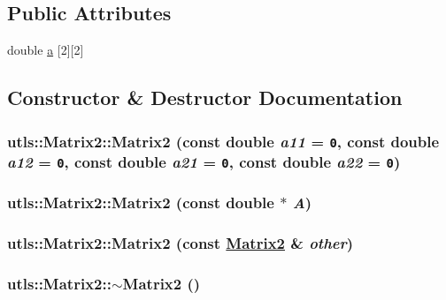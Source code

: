 \subsection*{Public Attributes}
\begin{CompactItemize}
\item 
double \hyperlink{classutls_1_1Matrix2_175b19b6eeaaa8cba29e9155c5bfa0d7}{a} \mbox{[}2\mbox{]}\mbox{[}2\mbox{]}
\end{CompactItemize}


\subsection{Constructor \& Destructor Documentation}
\hypertarget{classutls_1_1Matrix2_672d32b33a25b8f8ee2e430db994a94e}{
\subsubsection[Matrix2]{\setlength{\rightskip}{0pt plus 5cm}utls::Matrix2::Matrix2 (const double {\em a11} = {\tt 0}, const double {\em a12} = {\tt 0}, const double {\em a21} = {\tt 0}, const double {\em a22} = {\tt 0})}}
\label{classutls_1_1Matrix2_672d32b33a25b8f8ee2e430db994a94e}


\hypertarget{classutls_1_1Matrix2_3b81c157f31f6fba8e2145d326bc86ae}{
\subsubsection[Matrix2]{\setlength{\rightskip}{0pt plus 5cm}utls::Matrix2::Matrix2 (const double $\ast$ {\em A})}}
\label{classutls_1_1Matrix2_3b81c157f31f6fba8e2145d326bc86ae}


\hypertarget{classutls_1_1Matrix2_ef457753ff407d0a374c2d82cd60c40d}{
\subsubsection[Matrix2]{\setlength{\rightskip}{0pt plus 5cm}utls::Matrix2::Matrix2 (const \hyperlink{classutls_1_1Matrix2}{Matrix2} \& {\em other})}}
\label{classutls_1_1Matrix2_ef457753ff407d0a374c2d82cd60c40d}


\hypertarget{classutls_1_1Matrix2_76ca5ea4f2c561c7c5e1b734b0585b3f}{
\subsubsection[$\sim$Matrix2]{\setlength{\rightskip}{0pt plus 5cm}utls::Matrix2::$\sim$Matrix2 ()}}
\label{classutls_1_1Matrix2_76ca5ea4f2c561c7c5e1b734b0585b3f}




